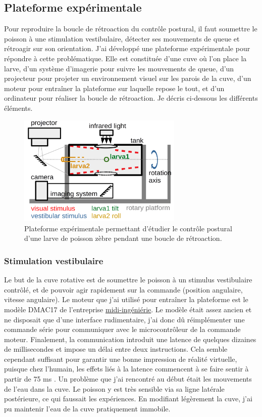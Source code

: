 \subsection{Plateforme expérimentale}

Pour reproduire la boucle de rétroaction du contrôle postural, il faut soumettre le poisson à une stimulation vestibulaire, détecter ses mouvements de queue et rétroagir sur son orientation. J'ai développé une plateforme expérimentale pour répondre à cette problématique. Elle est constituée d'une cuve où l'on place la larve, d'un système d'imagerie pour suivre les mouvements de queue, d'un projecteur pour projeter un environnement visuel sur les parois de la cuve, d'un moteur pour entraîner la plateforme sur laquelle repose le tout, et d'un ordinateur pour réaliser la boucle de rétroaction. Je décris ci-dessous les différents éléments.

\begin{figure}
\centering
\includegraphics[width=0.7\textwidth]{./files/schema_manip.png}
\caption{Plateforme expérimentale permettant d'étudier le contrôle postural d'une larve de poisson zèbre pendant une boucle de rétroaction.}
\end{figure}

\subsubsection{Stimulation vestibulaire}
Le but de la cuve rotative est de soumettre le poisson à un stimulus vestibulaire contrôlé, et de pouvoir agir rapidement sur la commande (position angulaire, vitesse angulaire). Le moteur que j'ai utilisé pour entraîner la plateforme est le modèle DMAC17 de l'entreprise \href{http://www.midi-ingenierie.com/}{midi-ingéniérie}. Le modèle était assez ancien et ne disposait que d'une interface rudimentaire, j'ai donc dû réimplémenter une commande série pour communiquer avec le microcontrôleur de la commande moteur. Finalement, la communication introduit une latence de quelques dizaines de millisecondes et impose un délai entre deux instructions. Cela semble cependant suffisant pour garantir une bonne impression de réalité virtuelle, puisque chez l'humain, les effets liés à la latence commencent à se faire sentir à partir de 75 ms \cite{waltemate_impact_2016}. Un problème que j'ai rencontré au début était les mouvements de l'eau dans la cuve. Le poisson y est très sensible via sa ligne latérale postérieure, ce qui faussait les expériences. En modifiant légèrement la cuve, j'ai pu maintenir l'eau de la cuve pratiquement immobile.

